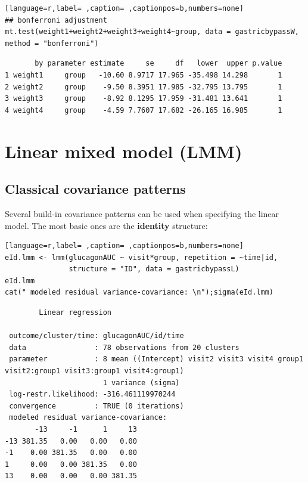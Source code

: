 \documentclass[12pt]{article}
\begin{document}
\begin{lstlisting}[language=r,label= ,caption= ,captionpos=b,numbers=none]
## bonferroni adjustment
mt.test(weight1+weight2+weight3+weight4~group, data = gastricbypassW, method = "bonferroni")
\end{lstlisting}

\begin{verbatim}
       by parameter estimate     se     df   lower  upper p.value
1 weight1     group   -10.60 8.9717 17.965 -35.498 14.298       1
2 weight2     group    -9.50 8.3951 17.985 -32.795 13.795       1
3 weight3     group    -8.92 8.1295 17.959 -31.481 13.641       1
4 weight4     group    -4.59 7.7607 17.682 -26.165 16.985       1
\end{verbatim}



\clearpage

\section{Linear mixed model (LMM)}
\label{sec:orge4cadfd}
\subsection{Classical covariance patterns}
\label{sec:org7cd6f32}

Several build-in covariance patterns can be used when specifying the
linear model. The most basic ones are the \textbf{identity} structure:
\begin{lstlisting}[language=r,label= ,caption= ,captionpos=b,numbers=none]
eId.lmm <- lmm(glucagonAUC ~ visit*group, repetition = ~time|id, 
               structure = "ID", data = gastricbypassL)
eId.lmm
cat(" modeled residual variance-covariance: \n");sigma(eId.lmm)
\end{lstlisting}

\begin{verbatim}
		Linear regression 

 outcome/cluster/time: glucagonAUC/id/time 
 data                : 78 observations from 20 clusters 
 parameter           : 8 mean ((Intercept) visit2 visit3 visit4 group1 visit2:group1 visit3:group1 visit4:group1) 
                       1 variance (sigma) 
 log-restr.likelihood: -316.461119970244 
 convergence         : TRUE (0 iterations)
 modeled residual variance-covariance: 
       -13     -1      1     13
-13 381.35   0.00   0.00   0.00
-1    0.00 381.35   0.00   0.00
1     0.00   0.00 381.35   0.00
13    0.00   0.00   0.00 381.35
\end{verbatim}
\end{document}

